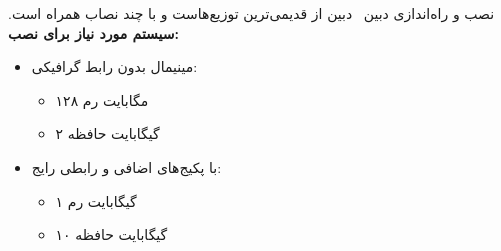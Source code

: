 
\subtitle{قسمت دوم: نصب}
\author{مهدی صفریان \alongside محمدیاسین داوده}

\start

\begin{frame}{نصب و راه‌اندازی دبین~\cite{deb_book}}
  دبین از قدیمی‌ترین توزیع‌هاست و با چند نصاب همراه است.
  \vfill
  \textbf{سیستم مورد نیاز برای نصب:}
  \begin{itemize}
    \item مینیمال بدون رابط گرافیکی:
    \begin{itemize}
      \item ۱۲۸ مگابایت رم
      \item ۲ گیگابایت حافظه
    \end{itemize}
    \item با پکیج‌های اضافی و رابطی رایج:
    \begin{itemize}
      \item ۱ گیگابایت رم
      \item ۱۰ گیگابایت حافظه
    \end{itemize}
  \end{itemize}
\end{frame}

